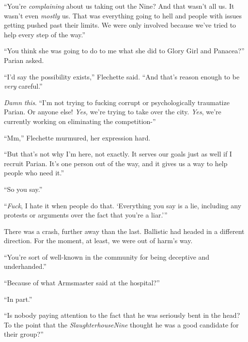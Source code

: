 ``You're \emph{complaining} about us taking out the Nine?  And that wasn't all us.  It wasn't even \emph{mostly} us.  That was everything going to hell and people with issues getting pushed past their limits.  We were only involved because we've tried to help every step of the way.''



``You think she was going to do to me what she did to Glory Girl and Panacea?'' Parian asked.



``I'd say the possibility exists,'' Flechette said. ``And that's reason enough to be \emph{very} careful.''



\emph{Damn this}.  ``I'm not trying to fucking corrupt or psychologically traumatize Parian.  Or anyone else!  \emph{Yes, }we're trying to take over the city.  \emph{Yes}, we're currently working on eliminating the competition-''



``Mm,'' Flechette murmured, her expression hard.



``But that's not why I'm here, not exactly.  It serves our goals just as well if I recruit Parian.  It's one person out of the way, and it gives us a way to help people who need it.''



``So you say.''



``\emph{Fuck}, I hate it when people do that.  `Everything you say is a lie, including any protests or arguments over the fact that you're a liar.'''



There was a crash, further away than the last.  Ballistic had headed in a different direction.  For the moment, at least, we were out of harm's way.



``You're sort of well-known in the community for being deceptive and underhanded.''



``Because of what Armsmaster said at the hospital?''



``In part.''



``Is nobody paying attention to the fact that he was seriously bent in the head?  To the point that the \emph{Slaughterhouse}\emph{Nine} thought he was a good candidate for their group?''



